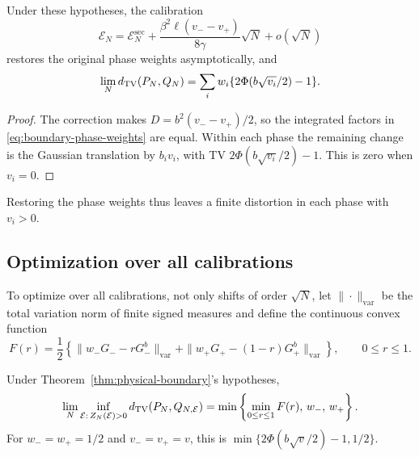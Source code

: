 \begin{corollary}
\label{cor:physical-compensation}
Under these hypotheses, the calibration
\begin{equation}
 \mathcal E_N=\mathcal E_N^{\mathrm{sec}}
 +\frac{\beta^2\ell(v_--v_+)}{8\gamma}\sqrt N+o(\sqrt N)
 \label{eq:physical-compensation}
\end{equation}
restores the original phase weights asymptotically, and
\begin{equation}
 \lim_Nd_{\mathrm{TV}}(P_N,Q_N)
 =\sum_iw_i\{2\Phi(b\sqrt{v_i}/2)-1\}.
 \label{eq:compensated-tv}
\end{equation}
\end{corollary}
\begin{proof}
The correction makes $D=b^2(v_--v_+)/2$, so the integrated factors
in \eqref{eq:boundary-phase-weights} are equal. Within each phase
the remaining change is the Gaussian translation by $b_iv_i$, with
TV $2\Phi(b\sqrt{v_i}/2)-1$. This is zero when $v_i=0$.
\end{proof}
Restoring the phase weights thus leaves a finite distortion in each
phase with $v_i>0$.

\subsection{Optimization over all calibrations}

To optimize over all calibrations, not only shifts of order $\sqrt N$,
let $\|\cdot\|_{\mathrm{var}}$ be the total variation norm of finite
signed measures and define the continuous convex function
\begin{equation}
 F(r)=\frac12\left\{
 \|w_-G_- -rG_-^b\|_{\mathrm{var}}
 +\|w_+G_+ -(1-r)G_+^b\|_{\mathrm{var}}\right\},
 \qquad 0\le r\le1.
 \label{eq:physical-boundary-objective}
\end{equation}

\begin{theorem}
\label{thm:physical-boundary-optimum}
Under Theorem~\ref{thm:physical-boundary}'s hypotheses,
\begin{equation}
 \lim_N\inf_{\mathcal E:\,Z_N(\mathcal E)>0}d_{\mathrm{TV}}(P_N,Q_{N,\mathcal E})
 =\min\left\{\min_{0\le r\le1}F(r),\,w_-,\,w_+\right\}.
 \label{eq:physical-optimal-boundary}
\end{equation}
For $w_-=w_+=1/2$ and $v_-=v_+=v$, this is
$\min\{2\Phi(b\sqrt v/2)-1,1/2\}$.
\end{theorem}

